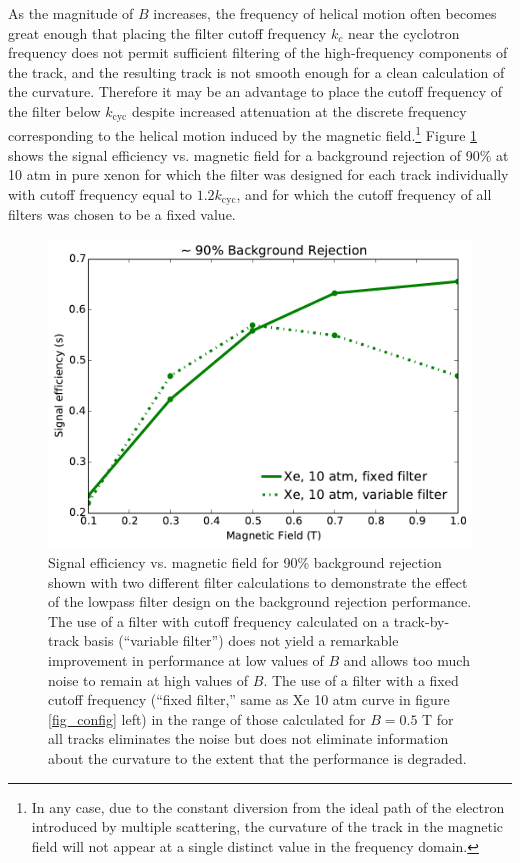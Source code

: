 \documentclass{JINST}
\begin{document}
As the magnitude of $B$ increases, the frequency of helical motion often becomes great enough that placing the 
filter cutoff frequency $k_{c}$ near the cyclotron frequency does not permit sufficient filtering of the 
high-frequency components of the track, and the resulting track is not smooth enough for a clean calculation of 
the curvature.  Therefore it may be an advantage to place the cutoff frequency of the filter below 
$k_{\mathrm{cyc}}$ despite increased attenuation at the discrete frequency corresponding to the helical motion 
induced by the magnetic field.\footnote{In any case, due to the constant diversion from the ideal path of the electron
introduced by multiple scattering, the curvature of the track in the magnetic field will not appear at a single 
distinct value in the frequency domain.}  Figure \ref{fig_FIRdependence} shows the signal efficiency vs. magnetic
field for a background rejection of 90\% at 10 atm in pure xenon for which the filter was designed for each track 
individually with cutoff frequency equal to $1.2k_{\mathrm{cyc}}$, and for which the cutoff frequency of all filters 
was chosen to be a fixed value.

\begin{figure}[!htb]
	\centering
	\includegraphics[scale=0.6]{fig/eff_vs_b_cf_filter_90.pdf}
	\caption{\label{fig_FIRdependence}Signal efficiency vs. magnetic field for 90\% background rejection shown with two different filter calculations to demonstrate the effect of the lowpass filter design on the background rejection performance.  The use of a filter with cutoff frequency calculated on a track-by-track basis (``variable filter'') does not yield a remarkable improvement in performance at low values of $B$ and allows too much noise to remain at high values of $B$.  The use of a filter with a fixed cutoff frequency (``fixed filter,'' same as Xe 10 atm curve in figure \protect\ref{fig_config} left) in the range of those calculated for $B = 0.5$ T for all tracks eliminates the noise but does not eliminate information about the curvature to the extent that the performance is degraded.}
\end{figure}
\end{document}

